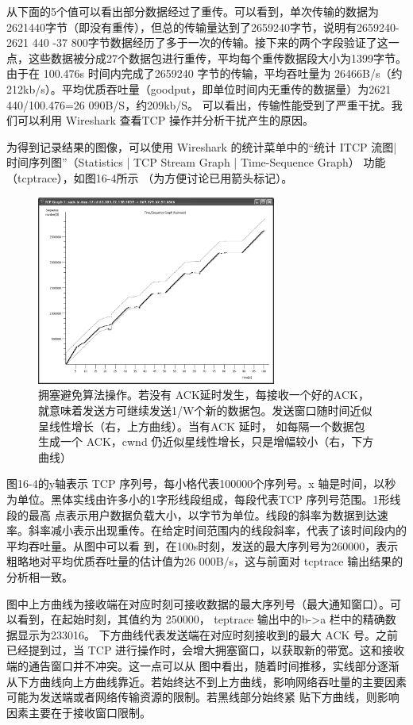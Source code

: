从下面的5个值可以看出部分数据经过了重传。可以看到，单次传输的数据为2621440字节（即没有重传），但总的传输量达到了2659240字节，说明有2659240-
2621 440 -37 800字节数据经历了多于一次的传输。接下来的两个字段验证了这一点，这些数据被分成27个数据包进行重传，平均每个重传数据段大小为1399字节。由于在 100.476s
时间内完成了2659240 字节的传输，平均吞吐量为 26466B/s（约212kb/s）。平均优质吞吐量（goodput，即单位时间内无重传的数据量）为2621 440/100.476=26 090B/S，约209kb/S。
可以看出，传输性能受到了严重干扰。我们可以利用 Wireshark 查看TCP 操作并分析干扰产生的原因。

为得到记录结果的图像，可以使用 Wireshark 的统计菜单中的“统计 ITCP 流图| 时间序列图”（Statistics | TCP Stream Graph | Time-Sequence Graph） 功能（tcptrace），如图16-4所示
（为方便讨论已用箭头标记）。

\begin{figure}[!htb]
    \centering
	\includegraphics[width=0.7\textwidth]{imgs/16/16-4.png}
	\caption{拥塞避免算法操作。若没有 ACK延时发生，每接收一个好的ACK，就意味着发送方可继续发送1/W个新的数据包。发送窗口随时间近似呈线性增长（右，上方曲线）。当有ACK 延时，
    如每隔一个数据包生成一个 ACK，cwnd 仍近似星线性增长，只是增幅较小（右，下方曲线）}
\end{figure}

图16-4的y轴表示 TCP 序列号，每小格代表100000个序列号。x 轴是时间，以秒为单位。黑体实线由许多小的1字形线段组成，每段代表TCP 序列号范围。1形线段的最高
点表示用户数据负载大小，以字节为单位。线段的斜率为数据到达速率。斜率减小表示出现重传。在给定时间范围内的线段斜率，代表了该时间段内的平均吞吐量。从图中可以看
到，在100s时刻，发送的最大序列号为260000，表示粗略地对平均优质吞吐量的估计值为26 000B/s，这与前面对 tcptrace 输出结果的分析相一致。

图中上方曲线为接收端在对应时刻可接收数据的最大序列号（最大通知窗口）。可以看到，在起始时刻，其值约为 250000， teptrace 输出中的b->a 栏中的精确数据显示为233016。
下方曲线代表发送端在对应时刻接收到的最大 ACK 号。之前已经提到过，当 TCP 进行操作时，会增大拥塞窗口，以获取新的带宽。这和接收端的通告窗口并不冲突。这一点可以从
图中看出，随着时间推移，实线部分逐渐从下方曲线向上方曲线靠近。若始终达不到上方曲线，影响网络吞吐量的主要因素可能为发送端或者网络传输资源的限制。若黑线部分始终紧
贴下方曲线，则影响因素主要在于接收窗口限制。


